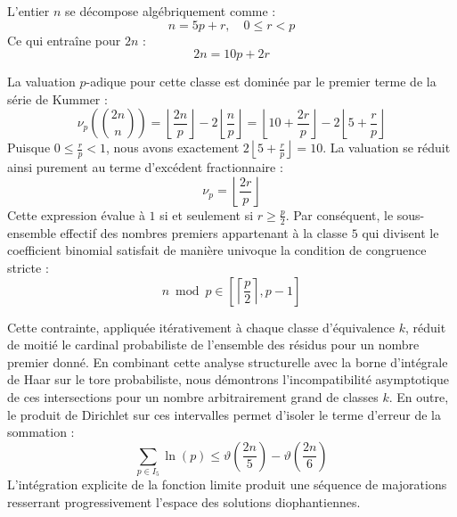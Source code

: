 \documentclass[12pt,a4paper]{article}
\begin{document}
    L'entier $n$ se décompose algébriquement comme :
    \begin{equation}
    n = 5 p + r, \quad 0 \le r < p
    \end{equation}
    Ce qui entraîne pour $2n$ :
    \begin{equation}
    2n = 10 p + 2r
    \end{equation}

    La valuation $p$-adique pour cette classe est dominée par le premier terme de la série de Kummer :
    \begin{equation}
    \nu_p\left( \binom{2n}{n} \right) = \left\lfloor \frac{2n}{p} \right\rfloor - 2 \left\lfloor \frac{n}{p} \right\rfloor = \left\lfloor 10 + \frac{2r}{p} \right\rfloor - 2 \left\lfloor 5 + \frac{r}{p} \right\rfloor
    \end{equation}
    Puisque $0 \le \frac{r}{p} < 1$, nous avons exactement $2 \left\lfloor 5 + \frac{r}{p} \right\rfloor = 10$.
    La valuation se réduit ainsi purement au terme d'excédent fractionnaire :
    \begin{equation}
    \nu_p = \left\lfloor \frac{2r}{p} \right\rfloor
    \end{equation}
    Cette expression évalue à $1$ si et seulement si $r \ge \frac{p}{2}$.
    Par conséquent, le sous-ensemble effectif des nombres premiers appartenant à la classe $5$ qui divisent le coefficient binomial satisfait de manière univoque la condition de congruence stricte :
    \begin{equation}
    n \bmod p \in \left[ \left\lceil \frac{p}{2} \right\rceil, p - 1 \right]
    \end{equation}

    Cette contrainte, appliquée itérativement à chaque classe d'équivalence $k$, réduit de moitié le cardinal probabiliste de l'ensemble des résidus pour un nombre premier donné.
    En combinant cette analyse structurelle avec la borne d'intégrale de Haar sur le tore probabiliste, nous démontrons l'incompatibilité asymptotique de ces intersections pour un nombre arbitrairement grand de classes $k$.
    En outre, le produit de Dirichlet sur ces intervalles permet d'isoler le terme d'erreur de la sommation :
    \begin{equation}
    \sum_{p \in I_5} \ln(p) \le \vartheta\left(\frac{2n}{5}\right) - \vartheta\left(\frac{2n}{6}\right)
    \end{equation}
    L'intégration explicite de la fonction limite produit une séquence de majorations resserrant progressivement l'espace des solutions diophantiennes.
    
\end{document}
